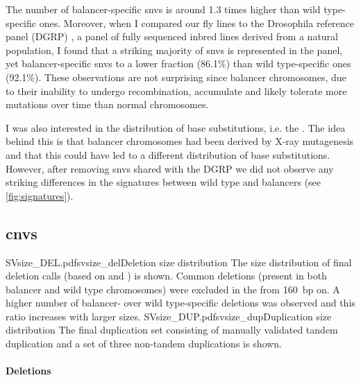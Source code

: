 The number of balancer-specific \acp{snv} is around 1.3 times higher than wild
type-specific ones. Moreover, when I compared our fly lines to the Drosophila
reference panel (DGRP) \citep{Mackay2012,Huang2014}, a panel of fully sequenced
inbred  lines derived from a natural population, I
found that a striking majority of \acp{snv} is represented in the panel, yet
balancer-specific \acp{snv} to a lower fraction (86.1\%) than wild type-specific
ones (92.1\%). These observations are not surprising since balancer chromosomes,
due to their inability to undergo recombination, accumulate and likely tolerate
more mutations over time than normal chromosomes.

I was also interested in the distribution of base substitutions, i.e.
the . The idea behind this is that
balancer chromosomes had been derived by X-ray mutagenesis and that this
could have led to a different distribution of base substitutions. However, after
removing \acp{snv} shared with the DGRP we did not observe any striking
differences in the \snv signatures between wild type and balancers (see
\cref{fig:signatures}).



\subsection{\texorpdfstring{\Aclp{cnv}}{Copy number variants}}
\label{sec:balancer_cnv}

\figuretwocolumns
    {SVsize_DEL.pdf}{svsize_del}{Deletion size distribution}
    {The size distribution of final deletion calls (based on \delly and
    \freebayes) is shown. Common deletions (present in both balancer and wild
    type chromosomes) were excluded in the from 160~bp on. A higher number of
     balancer- over wild type-specific deletions was observed and this ratio
     increases with larger sizes.}
    {SVsize_DUP.pdf}{svsize_dup}{Duplication size distribution}
    {The final duplication set consisting of manually validated tandem
    duplication and a set of three non-tandem duplications is shown.}


\paragraph{Deletions}

